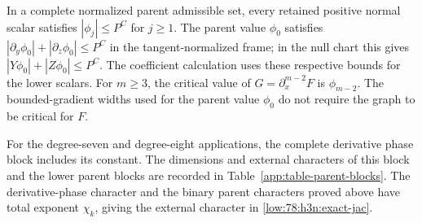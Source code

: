 \documentclass[11pt]{amsart}
\theoremstyle{definition}
\theoremstyle{remark}
\numberwithin{equation}{section}
\begin{document}
In a complete normalized parent admissible set, every retained positive normal scalar satisfies $|\phi_j|\le P^C$ for $j\ge1$. The parent value $\phi_0$ satisfies $|\partial_y\phi_0|+|\partial_z\phi_0|\le P^C$ in the tangent-normalized frame; in the null chart this gives $|Y\phi_0|+|Z\phi_0|\le P^C$. The coefficient calculation uses these respective bounds for the lower scalars. For $m\ge3$, the critical value of $G=\partial_x^{m-2}F$ is $\phi_{m-2}$. The bounded-gradient widths used for the parent value $\phi_0$ do not require the graph to be critical for $F$.

For the degree-seven and degree-eight applications, the complete derivative phase block includes its constant. The dimensions and external characters of this block and the lower parent blocks are recorded in Table~\ref{app:table-parent-blocks}. The derivative-phase character and the binary parent characters proved above have total exponent $\chi_k$, giving the external character in \eqref{low:78:h3n:exact-jac}.
\end{document}
